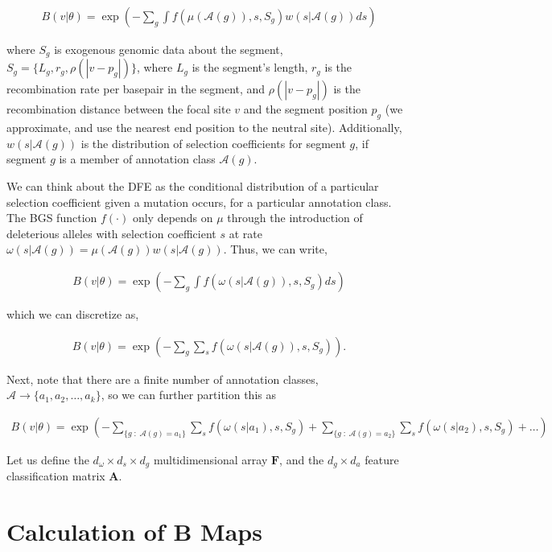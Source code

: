 \documentclass[11pt]{article}
\begin{document}
\begin{align}
  B(v | \theta) = \exp\left(- \sum_g \int f(\mu(\mathcal{A}(g)), s, S_g) w(s|\mathcal{A}(g)) ds \right)
\end{align}

where $S_g$ is exogenous genomic data about the segment, $S_g = \{L_g, r_g,
\rho(|v-p_g|)\}$, where $L_g$ is the segment's length, $r_g$ is the
recombination rate per basepair in the segment, and $\rho(|v-p_g|)$ is the
recombination distance between the focal site $v$ and the segment position
$p_g$ (we approximate, and use the nearest end position to the neutral site).
Additionally, $w(s|\mathcal{A}(g))$ is the distribution of selection
coefficients for segment $g$, if segment $g$ is a member of annotation class
$\mathcal{A}(g)$.

We can think about the DFE as the conditional distribution of a particular
selection coefficient given a mutation occurs, for a particular annotation
class. The BGS function $f(\cdot)$ only depends on $\mu$ through the
introduction of deleterious alleles with selection coefficient $s$ at rate
$\omega(s|\mathcal{A}(g)) = \mu(\mathcal{A}(g)) w(s | \mathcal{A}(g))$. Thus,
we can write, 

\begin{align}
  B(v | \theta) = \exp\left(- \sum_g \int f(\omega(s|\mathcal{A}(g)), s, S_g) ds \right)
\end{align}


which we can discretize as,

\begin{align}
  B(v | \theta) = \exp\left(- \sum_g \sum_s f(\omega(s|\mathcal{A}(g)), s, S_g) \right).
\end{align}

Next, note that there are a finite number of annotation classes, $\mathcal{A}
\to \{a_1, a_2, \ldots, a_k\}$, so we can further partition this as

\begin{align}
  B(v | \theta) = \exp\left(- \sum_{\{g \;:\; \mathcal{A}(g) = a_1\}} \sum_s f(\omega(s| a_1), s, S_g) + \sum_{\{g \;:\; \mathcal{A}(g) = a_2\}} \sum_s f(\omega(s| a_2), s, S_g) + \ldots  \right)
\end{align}

Let us define the $d_\omega \times d_s \times d_g$ multidimensional array
$\mathbf{F}$, and the $d_g \times d_a$ feature classification matrix
$\mathbf{A}$.



  
\section{Calculation of B Maps}
\end{document}
